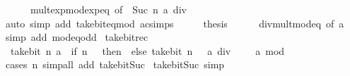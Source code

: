 \begin{isabellebody}
\ \ \ \ \ \ mult{\isacharunderscore}{\kern0pt}exp{\isacharunderscore}{\kern0pt}mod{\isacharunderscore}{\kern0pt}exp{\isacharunderscore}{\kern0pt}eq\ {\isacharbrackleft}{\kern0pt}of\ {}\ {\isacartoucheopen}Suc\ n{\isacartoucheclose}\ {\isacartoucheopen}a\ div\ {}{\isacartoucheclose}{\isacharbrackright}{\kern0pt}\isanewline
\ \ \ \ \isamarkupfalse%
\ {\isacharparenleft}{\kern0pt}auto\ simp\ add{\isacharcolon}{\kern0pt}\ take{\isacharunderscore}{\kern0pt}bit{\isacharunderscore}{\kern0pt}eq{\isacharunderscore}{\kern0pt}mod\ ac{\isacharunderscore}{\kern0pt}simps{\isacharparenright}{\kern0pt}\isanewline
\ \ \isamarkupfalse%
\ \isamarkupfalse%
\ {\isacharquery}{\kern0pt}thesis\isanewline
\ \ \ \ \isamarkupfalse%
\ div{\isacharunderscore}{\kern0pt}mult{\isacharunderscore}{\kern0pt}mod{\isacharunderscore}{\kern0pt}eq\ {\isacharbrackleft}{\kern0pt}of\ a\ {}{\isacharbrackright}{\kern0pt}\ \isamarkupfalse%
\ {\isacharparenleft}{\kern0pt}simp\ add{\isacharcolon}{\kern0pt}\ mod{\isacharunderscore}{\kern0pt}{}{\isacharunderscore}{\kern0pt}eq{\isacharunderscore}{\kern0pt}odd{\isacharparenright}{\kern0pt}\isanewline
{}\isamarkupfalse%
%
\endisatagproof
{\isafoldproof}%
%
\isadelimproof
\isanewline
%
\endisadelimproof
\isanewline
{}\isamarkupfalse%
\ take{\isacharunderscore}{\kern0pt}bit{\isacharunderscore}{\kern0pt}rec{\isacharcolon}{\kern0pt}\isanewline
\ \ {\isacartoucheopen}take{\isacharunderscore}{\kern0pt}bit\ n\ a\ {\isacharequal}{\kern0pt}\ {\isacharparenleft}{\kern0pt}if\ n\ {\isacharequal}{\kern0pt}\ {}\ then\ {}\ else\ take{\isacharunderscore}{\kern0pt}bit\ {\isacharparenleft}{\kern0pt}n\ {\isacharminus}{\kern0pt}\ {}{\isacharparenright}{\kern0pt}\ {\isacharparenleft}{\kern0pt}a\ div\ {}{\isacharparenright}{\kern0pt}\ {\isacharasterisk}{\kern0pt}\ {}\ {\isacharplus}{\kern0pt}\ a\ mod\ {}{\isacharparenright}{\kern0pt}{\isacartoucheclose}\isanewline
%
\isadelimproof
\ \ %
\endisadelimproof
%
\isatagproof
{}\isamarkupfalse%
\ {\isacharparenleft}{\kern0pt}cases\ n{\isacharparenright}{\kern0pt}\ {\isacharparenleft}{\kern0pt}simp{\isacharunderscore}{\kern0pt}all\ add{\isacharcolon}{\kern0pt}\ take{\isacharunderscore}{\kern0pt}bit{\isacharunderscore}{\kern0pt}Suc{\isacharparenright}{\kern0pt}%
\endisatagproof
{\isafoldproof}%
%
\isadelimproof
\isanewline
%
\endisadelimproof
\isanewline
{}\isamarkupfalse%
\ take{\isacharunderscore}{\kern0pt}bit{\isacharunderscore}{\kern0pt}Suc{\isacharunderscore}{\kern0pt}{}\ {\isacharbrackleft}{\kern0pt}simp{\isacharbrackright}{\kern0pt}{\isacharcolon}{\kern0pt}\isanewline

\end{isabellebody}
